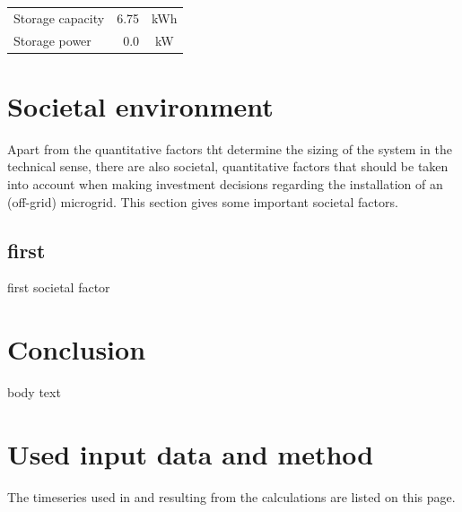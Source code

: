 \documentclass{article}
\begin{document}
\begin{multicols*}{2}
\begin{center}
\begin{tabular}{|l|r|c|}
Storage capacity&6.75&kWh\\ 

Storage power&0.0&kW\\ 

\hline

\end{tabular}

\label{tab:opextable}

\end{center}


\vspace{2.5mm}



\section*{Societal environment}

Apart from the quantitative factors tht determine the sizing of the system in the technical sense, there are also societal, quantitative factors that should be taken into account when making investment decisions regarding the installation of an (off-grid) microgrid. This section gives some important societal factors.

\subsection{first}

first societal factor

\section*{Conclusion}

body text

\newpage 

\appendix

\section*{Used input data and method}

The timeseries used in and resulting from the calculations are listed on this page.


\end{multicols*}
\end{document}
